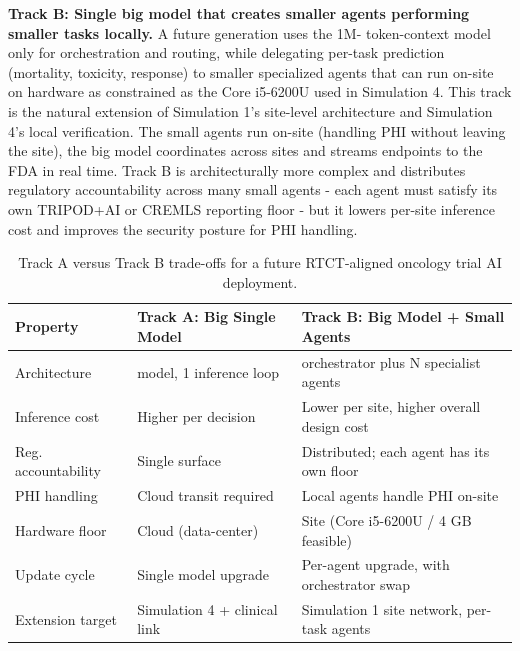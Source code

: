 \textbf{Track B: Single big model that creates smaller agents
performing smaller tasks locally.} A future generation uses the 1M-
token-context model only for orchestration and routing, while
delegating per-task prediction (mortality, toxicity, response) to
smaller specialized agents that can run on-site on hardware as
constrained as the Core i5-6200U used in Simulation 4. This track is
the natural extension of Simulation 1's site-level architecture and
Simulation 4's local verification. The small agents run on-site
(handling PHI without leaving the site), the big model coordinates
across sites and streams endpoints to the FDA in real time. Track B
is architecturally more complex and distributes regulatory
accountability across many small agents - each agent must satisfy
its own TRIPOD+AI or CREMLS reporting floor - but it lowers per-site
inference cost and improves the security posture for PHI handling.

\begin{table}[H]
\centering
\caption{Track A versus Track B trade-offs for a future RTCT-aligned
oncology trial AI deployment.}
\label{tab:future-tracks}
{\renewcommand{\arraystretch}{1.15}
\begin{tabular}{>{\raggedright\arraybackslash}p{3.5cm} >{\raggedright\arraybackslash}p{5cm} >{\raggedright\arraybackslash}p{6.6cm}}
\toprule
\textbf{Property} & \textbf{Track A: Big Single Model} & \textbf{Track B: Big Model + Small Agents} \\
\midrule
Architecture           & 1 model, 1 inference loop                & 1 orchestrator plus N specialist agents       \\
Inference cost         & Higher per decision                       & Lower per site, higher overall design cost     \\
Reg. accountability    & Single surface                            & Distributed; each agent has its own floor      \\
PHI handling           & Cloud transit required                    & Local agents handle PHI on-site                \\
Hardware floor         & Cloud (data-center)                       & Site (Core i5-6200U / 4 GB feasible)           \\
Update cycle           & Single model upgrade                      & Per-agent upgrade, with orchestrator swap      \\
Extension target       & Simulation 4 + clinical link              & Simulation 1 site network, per-task agents    \\
\bottomrule
\end{tabular}}
\end{table}


